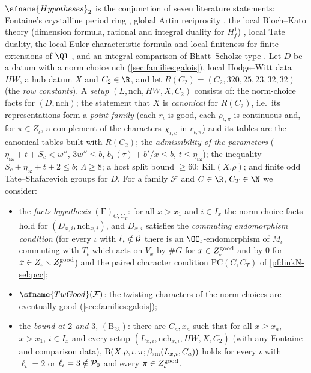 \begin{definition}\label{pf:linkN-sel:hyps}
$\sfname{Hypotheses}_2$ is the conjunction of seven literature statements: Fontaine's crystalline period ring
\cite{Fontaine1982,Fontaine1994}, global Artin reciprocity \cite{Artin1927,Neukirch1999}, the local Bloch--Kato theory (dimension
formula, rational and integral duality for $H^1_f$) \cite{BlochKato1990}, local Tate duality, the local Euler characteristic formula
and local finiteness for finite extensions of $\Ql$ \cite{Tate1963,Serre1997,NeukirchSchmidtWingberg2008}, and an integral comparison
of Bhatt--Scholze type \cite{BhattScholze2022,BhattScholze2023}. Let $D$ be a datum with a norm choice $\mathrm{nch}$
(\cref{sec:families:galois}), local Hodge--Witt data $HW$, a hub datum $X$ and $C_2\in\R$, and let $R(C_2)=(C_2,320,25,23,32,32)$ (the
\emph{row constants}). A \emph{setup} $(L,\mathrm{nch},HW,X,C_2)$ consists of: the norm-choice facts for $(D,\mathrm{nch})$; the
statement that $X$ is \emph{canonical} for $R(C_2)$, i.e.\ its representations form a \emph{point family} (each $r_\iota$ is good,
each $\rho_{\iota,\pi}$ is continuous and, for $\pi\in Z_\iota$, a complement of the characters $\chi_{\iota,c}$ in $r_{\iota,\pi}$) and
its tables are the canonical tables built with $R(C_2)$; the \emph{admissibility of the parameters} ($\eta_{\mathrm{sz}}+t+S_c<w''$,
$3w''\le b$, $b_T(\tau)+b'/x\le b$, $t\le\eta_{\mathrm{sz}}$); the inequality $S_c+\eta_{\mathrm{sz}}+t+2\le b$; $\Lambda\ge8$; a host
split bound $\ge60$; $\mathrm{Kill}(X.\rho)$; and finite odd Tate--Shafarevich groups for $D$. For a family $\mathcal F$ and $C\in\R$,
$C_T\in\N$ we consider:
\begin{itemize}
\item the \emph{facts hypothesis} $(\mathrm F)_{C,C_T}$: for all $x>x_1$ and $i\in I_x$ the norm-choice facts hold for
$(D_{x,i},\mathrm{nch}_{x,i})$, and $D_{x,i}$ satisfies the \emph{commuting endomorphism condition} (for every $\iota$ with
$\ell_\iota\notin\mathcal G$ there is an $\OO_\iota$-endomorphism of $M_\iota$ commuting with $T_\iota$ which acts on $V_x$ by $\#G$ for
$x\in Z^{\mathrm{good}}_\iota$ and by $0$ for $x\in Z_\iota\smallsetminus Z^{\mathrm{good}}_\iota$) and the paired character condition
$\mathrm{PC}(C,C_T)$ of \cref{pf:linkN-sel:pcc};
\item $\sfname{TwGood}(\mathcal F)$: the twisting characters of the norm choices are eventually good (\cref{sec:families:galois});
\item the \emph{bound at $2$ and $3$}, $(\mathrm B_{23})$: there are $C_a,x_a$ such that for all $x\ge x_a$, $x>x_1$, $i\in I_x$ and every
setup $(L_{x,i},\mathrm{nch}_{x,i},HW,X,C_2)$ (with any Fontaine and comparison data), $\mathrm{B}(X.\rho,\iota,\pi;\beta_{\mathrm{sm}}(L_{x,i},C_a))$
holds for every $\iota$ with $\ell_\iota=2$ or $\ell_\iota=3\notin\mathcal P_0$ and every $\pi\in Z^{\mathrm{good}}_\iota$.
\end{itemize}
\end{definition}

